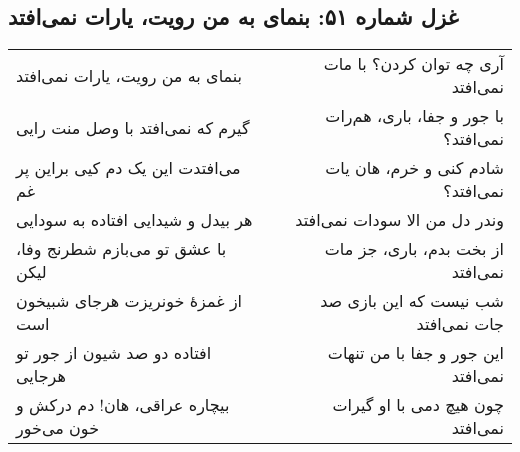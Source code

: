\begin{center}
\section*{غزل شماره ۵۱: بنمای به من رویت، یارات نمی‌افتد}
\label{sec:051}
\begin{longtable}{l p{0.5cm} r}
بنمای به من رویت، یارات نمی‌افتد
&&
آری چه توان کردن؟ با مات نمی‌افتد
\\
گیرم که نمی‌افتد با وصل منت رایی
&&
با جور و جفا، باری، هم‌رات نمی‌افتد؟
\\
می‌افتدت این یک دم کیی براین پر غم
&&
شادم کنی و خرم، هان یات نمی‌افتد؟
\\
هر بیدل و شیدایی افتاده به سودایی
&&
وندر دل من الا سودات نمی‌افتد
\\
با عشق تو می‌بازم شطرنج وفا، لیکن
&&
از بخت بدم، باری، جز مات نمی‌افتد
\\
از غمزهٔ خونریزت هرجای شبیخون است
&&
شب نیست که این بازی صد جات نمی‌افتد
\\
افتاده دو صد شیون از جور تو هرجایی
&&
این جور و جفا با من تنهات نمی‌افتد
\\
بیچاره عراقی، هان! دم درکش و خون می‌خور
&&
چون هیچ دمی با او گیرات نمی‌افتد
\\
\end{longtable}
\end{center}
